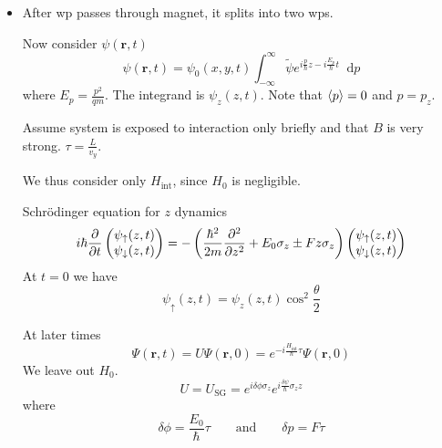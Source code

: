 \documentclass[11pt, a4paper]{article}
\newcommand{\diff}{\mathop{}\!\mathrm{d}} %
\newcommand{\Schro}{Schr\"{o}dinger\xspace}
\renewcommand{\vec}[1]{\bm{#1}}  %
\newcommand{\ua}{\uparrow}  %
\newcommand{\da}{\downarrow}  %
\renewcommand{\r}{\vec{r}}  %
\newcommand{\p}{\psi}  %
\begin{document}
\begin{itemize}
    \item After wp passes through magnet, it splits into two wps. 

    Now consider $ \psi(\r, t) $
    \begin{equation*}
        \p(\r, t) = \psi_{0}(x, y, t) \int_{-\infty}^{\infty} \tilde{\psi}e^{i \frac{p}{\hbar}z - i \frac{E_{p}}{\hbar}t}\diff p 
    \end{equation*}
    where $ E_{p} = \frac{p^{2}}{qm} $. The integrand is $ \psi_{z}(z, t) $. Note that $ \ev{p} = 0 $ and $ p = p_{z} $.


    Assume system is exposed to interaction only briefly and that $ B $ is very strong. $ \tau = \frac{L}{v_{y}} $. 
    
    We thus consider only $ H_{\text{int}} $, since $ H_{0} $ is negligible. 

    \Schro equation for $ z $ dynamics
    \begin{equation*}
        i \hbar \pdv{t} 
        \begin{pmatrix}
            \psi_{\ua}(z, t)\\
            \psi_{\da}(z, t)
        \end{pmatrix}
        = - \left( \frac{\hbar^{2}}{2m}\pdv[2]{}{z} + E_{0}\sigma_{z} \pm F z \sigma_{z} \right)
        \begin{pmatrix}
            \psi_{\ua}(z, t)\\
            \psi_{\da}(z, t)
        \end{pmatrix}
    \end{equation*}
    At $ t = 0 $ we have
    \begin{equation*}
        \psi_{\ua}(z, t) = \p_{z}(z, t) \cos^{2}\frac{\theta}{2}
    \end{equation*}


    At later times
    \begin{equation*}
        \Psi(\r, t) = U \Psi(\r, 0) = e^{-i \frac{H_{\text{int}}}{\hbar}\tau}\Psi(\r, 0)
    \end{equation*}
    We leave out $ H_{0} $. 
    \begin{equation*}
        U = U_{\text{SG}} = e^{i \delta\phi \sigma_{z}} e^{i \frac{\delta\psi}{\hbar} \sigma_{z}z} 
    \end{equation*}
    where
    \begin{equation*}
        \delta\phi = \frac{E_{0}}{\hbar} \tau \qquad \text{and} \qquad \delta p = F\tau
    \end{equation*}



\end{itemize}
\end{document}
